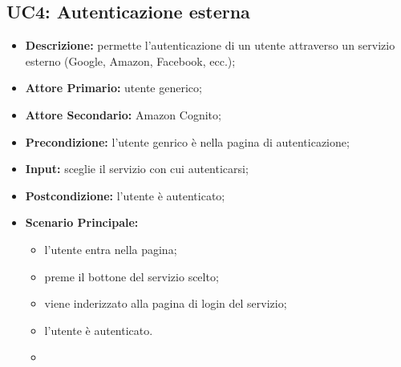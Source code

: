 \subsection{UC4: Autenticazione esterna}
        \label{sec:UC4}
        \begin{itemize}
            \item \textbf{Descrizione:} permette l'autenticazione di un utente attraverso un servizio esterno (Google, Amazon, Facebook, ecc.);
            \item \textbf{Attore Primario:} utente generico;
            \item \textbf{Attore Secondario:} Amazon Cognito;
            \item \textbf{Precondizione:} l'utente genrico è nella pagina di autenticazione;
            \item \textbf{Input:} sceglie il servizio con cui autenticarsi;
            \item \textbf{Postcondizione:} l'utente è autenticato;
            \item \textbf{Scenario Principale:} 
            \begin{itemize}
                \item l'utente entra nella pagina;
                \item preme il bottone del servizio scelto;
                \item viene inderizzato alla pagina di login del servizio;
                \item l'utente è autenticato.
                \item 
            \end{itemize}
        \end{itemize}